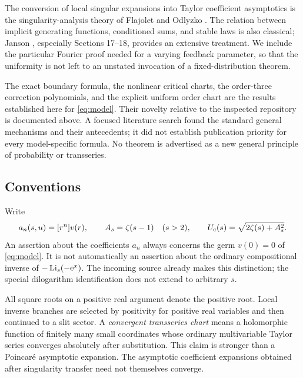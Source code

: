 The conversion of local singular expansions into Taylor coefficient
asymptotics is the singularity-analysis theory of Flajolet and Odlyzko
\cite{FO}.  The relation between implicit generating functions,
conditioned sums, and stable laws is also classical; Janson
\cite{Janson}, especially Sections 17--18, provides an extensive
treatment.  We include the particular Fourier proof needed for a
varying feedback parameter, so that the uniformity is not left to an
unstated invocation of a fixed-distribution theorem.

The exact boundary formula, the nonlinear critical charts, the
order-three correction polynomials, and the explicit uniform order
chart are the results established here for \eqref{eq:model}.
Their novelty relative to the inspected repository is documented above.
A focused literature search found the standard general mechanisms and
their antecedents; it did not establish publication priority for every
model-specific formula.  No theorem is advertised as a new general
principle of probability or transseries.

\subsection{Conventions}

Write
\[
 a_n(s,u)=[r^{n}] v(r),\qquad
 A_s=\zeta(s-1)\quad(s>2),\qquad
 U_{\mathrm c}(s)=\sqrt{2\zeta(s)+A_s^2}.
\]
An assertion about the coefficients $a_n$ always concerns the germ
$v(0)=0$ of \eqref{eq:model}.  It is not automatically an assertion
about the ordinary compositional inverse of $-\operatorname{Li}_s(-\mathrm e^x)$.
The incoming source already makes this distinction; the special
dilogarithm identification does not extend to arbitrary $s$.

All square roots on a positive real argument denote the positive root.
Local inverse branches are selected by positivity for positive real
variables and then continued to a slit sector.  A \emph{convergent
transseries chart} means a holomorphic function of finitely many small
coordinates whose ordinary multivariable Taylor series converges
absolutely after substitution.  This claim is stronger than a
Poincar\'e asymptotic expansion.  The asymptotic coefficient expansions
obtained after singularity transfer need not themselves converge.
